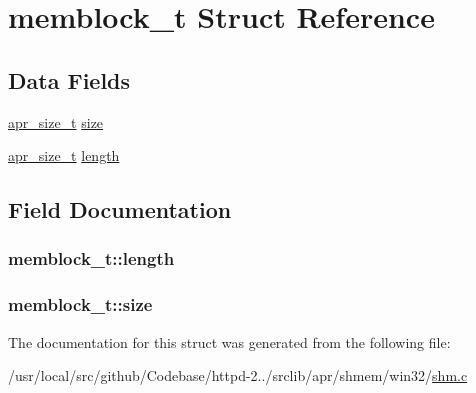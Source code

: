 \hypertarget{structmemblock__t}{}\section{memblock\+\_\+t Struct Reference}
\label{structmemblock__t}
\subsection*{Data Fields}
\begin{DoxyCompactItemize}
\item 
\hyperlink{group__apr__platform_gaaa72b2253f6f3032cefea5712a27540e}{apr\+\_\+size\+\_\+t} \hyperlink{structmemblock__t_adbb0b7a9e5bfe7844ac7055101a708d0}{size}
\item 
\hyperlink{group__apr__platform_gaaa72b2253f6f3032cefea5712a27540e}{apr\+\_\+size\+\_\+t} \hyperlink{structmemblock__t_ad542894fb68196c682cfcdbefa923ac6}{length}
\end{DoxyCompactItemize}


\subsection{Field Documentation}
\subsubsection[{\texorpdfstring{length}{length}}]{ memblock\+\_\+t\+::length}\hypertarget{structmemblock__t_ad542894fb68196c682cfcdbefa923ac6}{}\label{structmemblock__t_ad542894fb68196c682cfcdbefa923ac6}
\subsubsection[{\texorpdfstring{size}{size}}]{ memblock\+\_\+t\+::size}\hypertarget{structmemblock__t_adbb0b7a9e5bfe7844ac7055101a708d0}{}\label{structmemblock__t_adbb0b7a9e5bfe7844ac7055101a708d0}


The documentation for this struct was generated from the following file\+:\begin{DoxyCompactItemize}
\item 
/usr/local/src/github/\+Codebase/httpd-\/2../srclib/apr/shmem/win32/\hyperlink{win32_2shm_8c}{shm.\+c}\end{DoxyCompactItemize}

